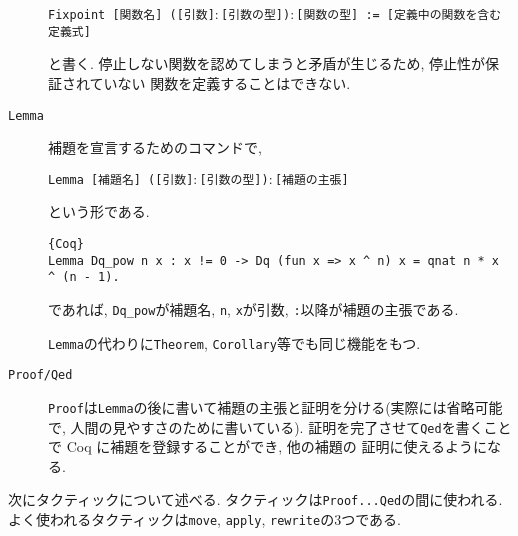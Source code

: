 \documentclass[11pt]{jsreport}
\theoremstyle{mystyle}
\newcommand{\0}{\textbf{0}}
\begin{document}
\begin{description}
    {\tt Fixpoint [関数名] ([引数]$\colon$[引数の型])$\colon$[関数の型] := 
    [定義中の関数を含む定義式]}
    
    と書く. 停止しない関数を認めてしまうと矛盾が生じるため, 停止性が保証されていない
    関数を定義することはできない. 
  \item[\tt Lemma]
    補題を宣言するためのコマンドで,
    
    {\tt Lemma [補題名] ([引数]$\colon$[引数の型])$\colon$[補題の主張]}
    
    という形である. 
    \begin{lstlisting}{Coq}
Lemma Dq_pow n x : x != 0 -> Dq (fun x => x ^ n) x = qnat n * x ^ (n - 1). \end{lstlisting}
    であれば, {\tt Dq\_pow}が補題名, {\tt n}, {\tt x}が引数, {\tt :}以降が補題の主張である. 
    
    {\tt Lemma}の代わりに{\tt Theorem}, {\tt Corollary}等でも同じ機能をもつ. 
  \item[\tt Proof/Qed]
    {\tt Proof}は{\tt Lemma}の後に書いて補題の主張と証明を分ける(実際には省略可能で, 
    人間の見やすさのために書いている). 
    証明を完了させて{\tt Qed}を書くことで Coq に補題を登録することができ, 他の補題の
    証明に使えるようになる. 
\end{description}
次にタクティックについて述べる. タクティックは{\tt Proof...Qed}の間に使われる. よく使われるタクティックは{\tt move}, {\tt apply}, {\tt rewrite}の3つである. 
\end{document}
